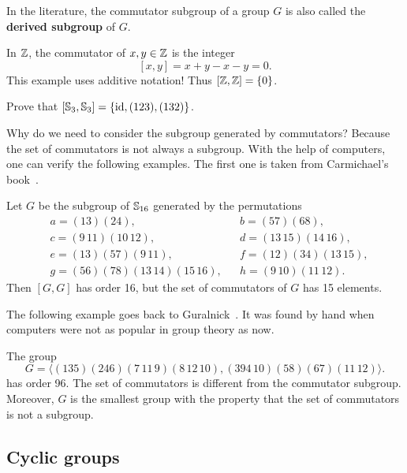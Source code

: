 In the literature, the commutator subgroup of a group $G$ is also called the \textbf{derived 
subgroup} of $G$. 
       
\begin{example}
        In $\mathbb{Z}$, the commutator of $x,y\in \mathbb{Z}$ 
        is the integer
        \[
        [x,y]=x+y-x-y=0.
        \]
        This example uses additive notation! 
        Thus $[\mathbb{Z},\mathbb{Z}]=\{0\}$. 
\end{example}
        
\begin{exercise}
        Prove that $[\mathbb{S}_3,\mathbb{S}_3]=\{\operatorname{id},(123),(132)\}$.
\end{exercise}
        
Why do we need to consider the subgroup 
generated by commutators? Because the set of commutators 
is not always a subgroup. With the help of computers, 
one can verify the following examples. 
The first one is taken from Carmichael's book~\cite{MR0075938}.

\begin{example}
        Let $G$ be the subgroup of $\mathbb{S}_{16}$ 
        generated by the permutations 
        \begin{align*}
&a = (13)(24),&&
b = (57)(68),\\
&c = (9\,11)(10\,12),&&
d = (13\,15)(14\,16),\\
&e = (13)(57)(9\,11),&&
f = (12)(34)(13\,15),\\
&g = (56)(78)(13\,14)(15\,16),&&
h = (9\,10)(11\,12).
\end{align*}
Then $[G,G]$ has order 16, but the set of commutators of 
$G$ has 15 elements. 
\end{example}

The following example goes back to Guralnick~\cite{MR673806}. 
It was found by hand when computers were not as popular
in group theory as now. 

\begin{example}
The group 
\[
G=\langle (135)(246)(7\,11\,9)(8\,12\,10),(394\,10)(58)(67)(11\,12)\rangle.
\]
has order 96. The set of commutators 
is different from the commutator subgroup. Moreover, 
$G$ is the smallest group with the property that  
the set of commutators is not a subgroup. 
\end{example}

\subsection{Cyclic groups}

